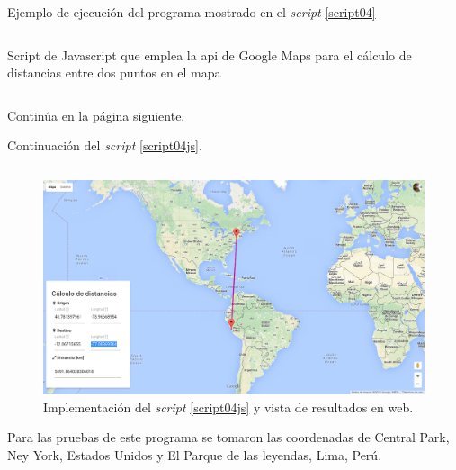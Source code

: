 \documentclass[a4paper,12pt,final]{article}
\begin{document}
      \begin{listing}[H]
        \caption{Ejemplo de ejecución del programa mostrado en el
        \emph{script} \ref{script04}}
        \label{script04sample}
        \inputminted{text}{./laboratorio_1/problema04_sample.txt}
      \end{listing}
      \vspace{\fill}

      \newpage
      \begin{listing}[H]
        \caption{Script de Javascript que emplea la api de Google Maps para el
        cálculo de distancias entre dos puntos en el mapa}
        \label{script04js}
        \inputminted[lastline=55]{javascript}{./laboratorio_1/problema04.js}
      \end{listing}
      \vspace{-1em}
      \noindent Continúa en la página siguiente.
      \vspace{\fill}

      \newpage
      \noindent\small{Continuación del \emph{script} \ref{script04js}.}
      \vspace{-1em}
      \begin{listing}[H]
        \inputminted[firstline=57]{javascript}{./laboratorio_1/problema04.js}
      \end{listing}
      \vspace{-1em}

      \begin{figure}[H]
        \caption{Implementación del \emph{script} \ref{script04js} y vista de
        resultados en web.}
        \label{script04figure}
        \includegraphics[width=\textwidth]{./laboratorio_1/problema04js_sample.png}
      \end{figure}

      \noindent Para las pruebas de este programa se tomaron las coordenadas de
      Central Park, Ney York, Estados Unidos y El Parque de las leyendas,
      Lima, Perú.
      \vspace{\fill}
\end{document}
